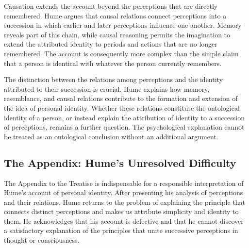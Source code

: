 \label{para:VS.B01.P01.C08.S09.SS07.P006}

Causation extends the account beyond the perceptions
that are directly remembered. Hume argues that
causal relations connect perceptions into a
succession in which earlier and later perceptions
influence one another. Memory reveals part of
this chain, while causal reasoning permits the
imagination to extend the attributed identity
to periods and actions that are no longer
remembered. The account is consequently more
complex than the simple claim that a person
is identical with whatever the person currently
remembers.
\cite[1.4.6.18--20, SBN 260--262]{HumeTreatise}

\begin{center}

\end{center}

\label{para:VS.B01.P01.C08.S09.SS07.P007}

The distinction between the relations among perceptions
and the identity attributed to their succession
is crucial. Hume explains how memory, resemblance,
and causal relations contribute to the formation
and extension of the idea of personal identity.
Whether these relations constitute the ontological
identity of a person, or instead explain the
attribution of identity to a succession of
perceptions, remains a further question. The
psychological explanation cannot be treated
as an ontological conclusion without an
additional argument.



\subsection{The Appendix: Hume's Unresolved Difficulty}
\label{subsec:ch08-hume-appendix}

\label{para:VS.B01.P01.C08.S09.SS08.P001}

The Appendix to the Treatise is indispensable for
a responsible interpretation of Hume's account
of personal identity. After presenting his analysis
of perceptions and their relations, Hume returns
to the problem of explaining the principle that
connects distinct perceptions and makes us attribute
simplicity and identity to them. He acknowledges
that his account is defective and that he cannot
discover a satisfactory explanation of the
principles that unite successive perceptions
in thought or consciousness.
\cite[Appendix, paragraphs 19--21, SBN 635--636]{HumeTreatise}

